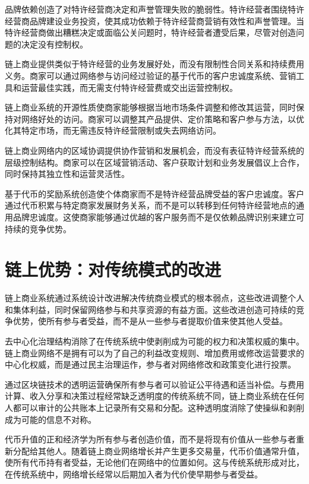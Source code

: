 \documentclass[
  Letterpaper,
]{scrbook}
\begin{document}
品牌依赖创造了对特许经营商决定和声誉管理失败的脆弱性。特许经营者围绕特许经营商品牌建设业务投资，使其成功依赖于特许经营商营销有效性和声誉管理。当特许经营商做出糟糕决定或面临公关问题时，特许经营者遭受后果，尽管对创造问题的决定没有控制权。

链上商业提供类似于特许经营的业务发展好处，而没有限制性合同关系和持续费用义务。商家可以通过网络参与访问经过验证的基于代币的客户忠诚度系统、营销工具和运营最佳实践，而无需支付特许经营费或交出运营控制权。

链上商业系统的开源性质使商家能够根据当地市场条件调整和修改其运营，同时保持对网络好处的访问。商家可以调整其产品提供、定价策略和客户参与方法，以优化其特定市场，而无需违反特许经营限制或失去网络访问。

链上商业网络内的区域协调提供协作营销和发展机会，而没有表征特许经营系统的层级控制结构。商家可以在区域营销活动、客户获取计划和业务发展倡议上合作，同时保持其独立性和运营灵活性。

基于代币的奖励系统创造使个体商家而不是特许经营品牌受益的客户忠诚度。客户通过代币积累与特定商家发展财务关系，而不是可以转移到任何特许经营地点的通用品牌忠诚度。这使商家能够通过优越的客户服务而不是仅依赖品牌识别来建立可持续的竞争优势。

\section{链上优势：对传统模式的改进}\label{ux94feux4e0aux4f18ux52bfux5bf9ux4f20ux7edfux6a21ux5f0fux7684ux6539ux8fdb}

链上商业系统通过系统设计改进解决传统商业模式的根本弱点，这些改进调整个人和集体利益，同时保留网络参与和共享资源的有益方面。这些改进创造可持续的竞争优势，使所有参与者受益，而不是从一些参与者提取价值来使其他人受益。

去中心化治理结构消除了在传统系统中使剥削成为可能的权力和决策权威的集中。链上商业网络不是拥有可以为了自己的利益改变规则、增加费用或修改运营要求的中心化权威，而是通过民主治理运作，参与者对网络修改和政策变化进行投票。

通过区块链技术的透明运营确保所有参与者可以验证公平待遇和适当补偿。与费用计算、收入分享和决策过程经常缺乏透明度的传统系统不同，链上商业系统在任何人都可以审计的公共账本上记录所有交易和分配。这种透明度消除了使操纵和剥削成为可能的信息不对称。

代币升值的正和经济学为所有参与者创造价值，而不是将现有价值从一些参与者重新分配给其他人。随着链上商业网络增长并产生更多交易量，代币价值通常升值，使所有代币持有者受益，无论他们在网络中的位置如何。这与传统系统形成对比，在传统系统中，网络增长经常以后期加入者为代价使早期参与者受益。
\end{document}

